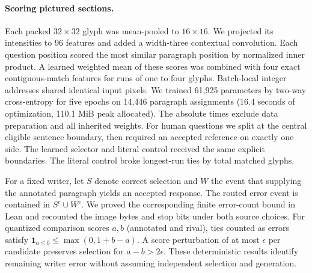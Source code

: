 \paragraph{Scoring pictured sections.}
Each packed $32\times32$ glyph was mean-pooled to $16\times16$. We projected its intensities to 96 features and added a width-three contextual convolution. Each question position scored the most similar paragraph position by normalized inner product. A learned weighted mean of these scores was combined with four exact contiguous-match features for runs of one to four glyphs. Batch-local integer addresses shared identical input pixels. We trained 61,925 parameters by two-way cross-entropy for five epochs on 14,446 paragraph assignments (16.4 seconds of optimization, 110.1 MiB peak allocated). The absolute times exclude data preparation and all inherited weights. For human questions we split at the central eligible sentence boundary, then required an accepted reference on exactly one side. The learned selector and literal control received the same explicit boundaries. The literal control broke longest-run ties by total matched glyphs.

For a fixed writer, let $S$ denote correct selection and $W$ the event that supplying the annotated paragraph yields an accepted response. The routed error event is contained in $S^c\cup W^c$. We proved the corresponding finite error-count bound in Lean and recounted the image bytes and stop bits under both source choices. For quantized comparison scores $a,b$ (annotated and rival), ties counted as errors satisfy $\mathbf{1}_{a\leq b}\leq\max(0,1+b-a)$. A score perturbation of at most $\epsilon$ per candidate preserves selection for $a-b>2\epsilon$. These deterministic results identify remaining writer error without assuming independent selection and generation.
